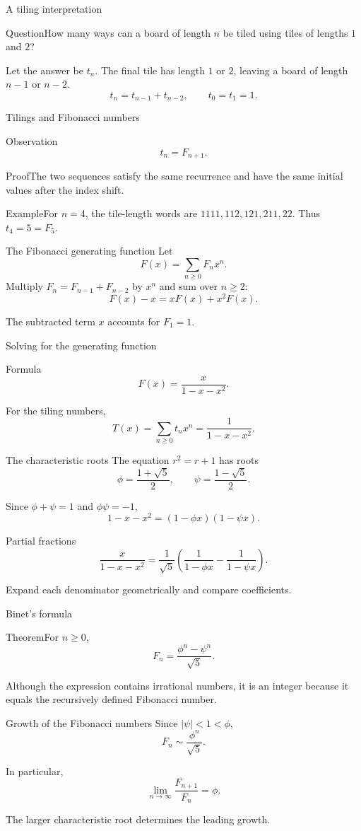 \documentclass[aspectratio=169,11pt]{beamer}
\newcommand{\Thm}[2]{\begin{block}{#1}#2\end{block}}
\renewcommand{\Proof}[1]{\begin{block}{Proof}\normalsize #1\end{block}}
\newcommand{\Question}[1]{\begin{block}{Question}#1\end{block}}
\renewcommand{\Example}[1]{\begin{block}{Example}#1\end{block}}
\newcommand{\gap}{\par\medskip}
\begin{document}
\begin{frame}{A tiling interpretation}
\large
\Question{How many ways can a board of length $n$ be tiled using tiles of lengths $1$ and $2$?}
\gap Let the answer be $t_n$. The final tile has length $1$ or $2$, leaving a board of length $n-1$ or $n-2$.
\[t_n=t_{n-1}+t_{n-2},\qquad t_0=t_1=1.\]
\end{frame}
\begin{frame}{Tilings and Fibonacci numbers}
\large
\Thm{Observation}{\[t_n=F_{n+1}.\]}
\Proof{The two sequences satisfy the same recurrence and have the same initial values after the index shift.}
\Example{For $n=4$, the tile-length words are $1111,112,121,211,22$. Thus $t_4=5=F_5$.}
\end{frame}
\begin{frame}{The Fibonacci generating function}
\large
Let
\[F(x)=\sum_{n\geq0}F_nx^n.\]
Multiply $F_n=F_{n-1}+F_{n-2}$ by $x^n$ and sum over $n\geq2$:
\[F(x)-x=xF(x)+x^2F(x).\]
\gap The subtracted term $x$ accounts for $F_1=1$.
\end{frame}
\begin{frame}{Solving for the generating function}
\large
\Thm{Formula}{\[F(x)=\frac{x}{1-x-x^2}.\]}
\gap For the tiling numbers,
\[T(x)=\sum_{n\geq0}t_nx^n=\frac1{1-x-x^2}.\]
\end{frame}
\begin{frame}{The characteristic roots}
\large
The equation $r^2=r+1$ has roots
\[\phi=\frac{1+\sqrt5}{2},\qquad\psi=\frac{1-\sqrt5}{2}.\]
\gap Since $\phi+\psi=1$ and $\phi\psi=-1$,
\[1-x-x^2=(1-\phi x)(1-\psi x).\]
\end{frame}
\begin{frame}{Partial fractions}
\large
\[\frac{x}{1-x-x^2}
=\frac1{\sqrt5}\left(\frac1{1-\phi x}-\frac1{1-\psi x}\right).\]
\gap Expand each denominator geometrically and compare coefficients.
\end{frame}
\begin{frame}{Binet's formula}
\large
\Thm{Theorem}{For $n\geq0$,
\[F_n=\frac{\phi^n-\psi^n}{\sqrt5}.\]}
\gap Although the expression contains irrational numbers, it is an integer because it equals the recursively defined Fibonacci number.
\end{frame}
\begin{frame}{Growth of the Fibonacci numbers}
\large
Since $|\psi|<1<\phi$,
\[F_n\sim\frac{\phi^n}{\sqrt5}.\]
\gap In particular,
\[\lim_{n\to\infty}\frac{F_{n+1}}{F_n}=\phi.\]
\gap The larger characteristic root determines the leading growth.
\end{frame}
\end{document}

